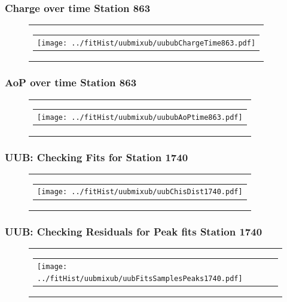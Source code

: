 \documentclass[aspectratio=169]{beamer}
\begin{document}
\begin{frame}
  \frametitle{Charge over time Station 863}
  \begin{figure}
    \centering
    \begin{tabularx}{\textwidth}{C}
      \begin{tabular}{l}
        \texttt{[image: ../fitHist/uubmixub/uububChargeTime863.pdf]}
      \end{tabular}
    \end{tabularx}
  \end{figure}
\end{frame}

\begin{frame}
  \frametitle{AoP over time Station 863}
  \begin{figure}
    \centering
    \begin{tabularx}{\textwidth}{C}
      \begin{tabular}{l}
        \texttt{[image: ../fitHist/uubmixub/uububAoPtime863.pdf]}
      \end{tabular}
    \end{tabularx}
  \end{figure}
\end{frame}


\begin{frame}
  \frametitle{UUB: Checking Fits for Station 1740}
  \begin{figure}
    \centering
    \begin{tabularx}{\textwidth}{C}
      \begin{tabular}{l}
        \texttt{[image: ../fitHist/uubmixub/uubChisDist1740.pdf]}
      \end{tabular}
    \end{tabularx}
  \end{figure}
\end{frame}

\begin{frame}
  \frametitle{UUB: Checking Residuals for Peak fits Station 1740}
  \begin{figure}
    \centering
    \begin{tabularx}{\textwidth}{C}
      \begin{tabular}{l}
        \texttt{[image: ../fitHist/uubmixub/uubFitsSamplesPeaks1740.pdf]}
      \end{tabular}
    \end{tabularx}
  \end{figure}
\end{frame}
\end{document}
